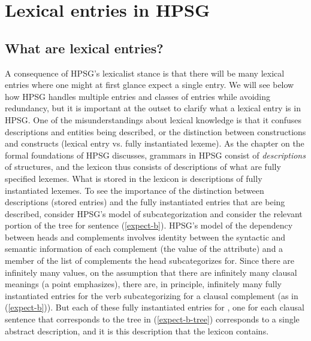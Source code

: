\documentclass[output=paper]{langsci/langscibook}
\begin{document}
\section{Lexical entries in HPSG}

\subsection{What are lexical entries?}

A consequence of HPSG's lexicalist stance is that there will be many lexical entries where one might at first glance expect a single entry. We will see below how HPSG handles multiple entries and classes of entries while avoiding redundancy, but it is important at the outset to clarify what a lexical entry is in HPSG. One of the misunderstandings about lexical knowledge is that it confuses descriptions and entities being described, or the distinction between constructions and constructs (lexical entry vs. fully instantiated lexeme). As the chapter on the formal foundations of HPSG discusses, grammars in HPSG consist of \emph{descriptions} of structures, and the lexicon thus consists of descriptions of what are fully specified lexemes. What is stored in the lexicon is descriptions of fully instantiated lexemes. To see the importance of the distinction between descriptions (stored entries) and the fully instantiated entries that are being described, consider HPSG's model of subcategorization and consider the relevant portion of the tree for sentence (\ref{expect-b}). HPSG's model of the dependency between heads and complements involves identity between the syntactic and semantic information of each complement (the value of the  attribute) and a member of the list of complements the head subcategorizes for. Since there are infinitely many  values, on the assumption that there are infinitely many clausal meanings (a point \citet{Jackendoff1990} emphasizes), there are, in principle, infinitely many fully instantiated entries for the verb  subcategorizing for a clausal complement (as in (\ref{expect-b})). But each of these fully instantiated entries for , one for each clausal sentence that corresponds to the tree in (\ref{expect-b-tree}) corresponds to a single abstract description, and it is this description that the lexicon contains. 

\begin{exe}
	\ex\label{expect-b-tree}
	\Tree
	[ {\begin{avm}\[comps & \< \@1 \>\]\end{avm}} 
	{\begin{avm}\[synsem & \@1 \]\end{avm}} ]
\end{exe}  
\end{document}
